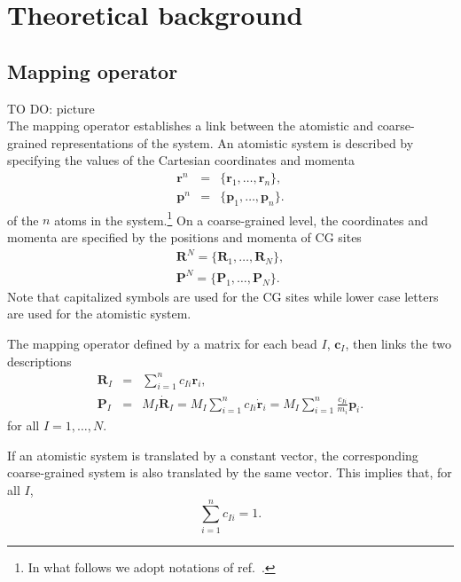 \chapter{Theoretical background}

\section{Mapping operator}
\label{sec:mapping_operator}
TO DO: picture \\

The mapping operator establishes a link between the atomistic and coarse-grained representations of the system. An atomistic system is described by specifying the values of the Cartesian coordinates and momenta  
\begin{eqnarray}
\bm r^n &=& \{\bm r_1,\dots,\bm r_n\}, \\
\bm p^n &=& \{\bm p_1,\dots,\bm p_n\}.
\end{eqnarray}
of the $n$ atoms in the system.\footnote{In what follows we adopt notations of ref.~\cite{Noid:2008.1}.} 
%
On a coarse-grained level, the coordinates and momenta are specified by the positions and momenta of CG sites 
\begin{eqnarray}
\bm R^N = \{\bm R_1,\dots,\bm R_N\}, \\ 
\bm P^N = \{\bm P_1,\dots,\bm P_N\}.
\end{eqnarray}
Note that capitalized symbols are used for the CG sites while lower case letters are used for the atomistic system.

The mapping operator defined by a matrix for each bead $I$, ${\bm c}_I$, then links the two descriptions
\begin{eqnarray}
 {\bm R}_I &=& \sum_{i=1}^{n}c_{Ii}\bm r_i, \\
 {\bm P}_I &=& 
 	M_I \dot{{\bm R}}_I = 
	M_I \sum_{i=1}^{n}c_{Ii} \dot{{\bm r}}_i = 
	M_I \sum_{i=1}^{n} \frac{ c_{Ii}} {m_i} {\bm p}_i . 
\label{eq:mapping_scheme}
\end{eqnarray}
for all $I = 1,\dots,N$.

If an atomistic system is translated by a constant vector, the corresponding coarse-grained system is also translated by the same vector. This implies that, for all $I$,
\begin{equation}
 \sum_{i=1}^{n}c_{Ii}=1.
\end{equation}

